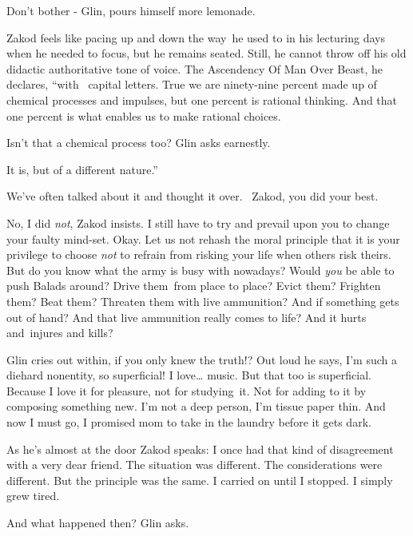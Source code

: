 \documentclass[12pt]{book}
\begin{document}
{\textquotedbl}Don't bother -{\textquotedbl} Glin, pours himself more lemonade.

Zakod feels like pacing up and down the way~he used to in his lecturing days when he needed to focus, but he remains
seated. Still, he cannot throw off his old didactic authoritative tone of voice. {\textquotedbl}The Ascendency Of Man
Over Beast,{\textquotedbl} he declares, ``with \ capital letters. True we are ninety-nine percent made up of chemical
processes and impulses, but one percent is rational thinking. And that one percent is what enables us to make rational
choices.{\textquotedbl}

{\textquotedbl}Isn't that a chemical process too?{\textquotedbl} Glin asks{
}earnestly.

{\textquotedbl}It is, but of a different nature.''

{\textquotedbl}We've often talked about it and thought it over. \ Zakod, you did your best.{\textquotedbl}

{\textquotedbl}No, I did \textit{not},{\textquotedbl} Zakod insists. {\textquotedbl}I still have to try and prevail upon
you to change your faulty mind-set. Okay. Let us not rehash the moral principle that it is your privilege to choose
\textit{not} to refrain from risking your life when others risk theirs. But do you know what the army is busy with
nowadays? Would \textit{you} be able to push Balads around? Drive them~from place to place? Evict them? Frighten them?
Beat them? Threaten them with live ammunition? And if something gets out of hand? And that live ammunition really comes
to life? And it hurts and~injures and kills?{\textquotedbl}

Glin cries out within, if you only knew the truth!? Out loud he says, {\textquotedbl}I'm such a diehard nonentity, so
superficial! I love{\dots} music. But that too is superficial. Because I love it for pleasure, not for studying~it. Not
for adding to it by composing something new. I'm not a deep person, I'm tissue paper thin. And now I must go, I
promised mom to take in the laundry before it gets dark.{\textquotedbl}

As he's almost at the door Zakod speaks: {\textquotedbl}I once had that kind of disagreement with a very dear friend.
The situation was different. The considerations were different. But the principle was the same. I carried on until I
stopped. I simply{ }grew tired.{\textquotedbl}

{\textquotedbl}And what happened then?{\textquotedbl} Glin asks.
\end{document}
